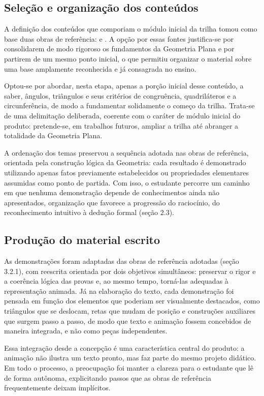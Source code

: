 \subsection{Seleção e organização dos conteúdos}

A definição dos conteúdos que comporiam o módulo inicial da trilha tomou como base duas obras de referência:  e . A opção por essas fontes justifica-se por consolidarem de modo rigoroso os fundamentos da Geometria Plana e por partirem de um mesmo ponto inicial, o que permitiu organizar o material sobre uma base amplamente reconhecida e já consagrada no ensino.

Optou-se por abordar, nesta etapa, apenas a porção inicial desse conteúdo, a saber, ângulos, triângulos e seus critérios de congruência, quadriláteros e a circunferência, de modo a fundamentar solidamente o começo da trilha. Trata-se de uma delimitação deliberada, coerente com o caráter de módulo inicial do produto: pretende-se, em trabalhos futuros, ampliar a trilha até abranger a totalidade da Geometria Plana.

A ordenação dos temas preservou a sequência adotada nas obras de referência, orientada pela construção lógica da Geometria: cada resultado é demonstrado utilizando apenas fatos previamente estabelecidos ou propriedades elementares assumidas como ponto de partida. Com isso, o estudante percorre um caminho em que nenhuma demonstração depende de conhecimentos ainda não apresentados, organização que favorece a progressão do raciocínio, do reconhecimento intuitivo à dedução formal (seção 2.3).

\subsection{Produção do material escrito}

As demonstrações foram adaptadas das obras de referência adotadas (seção 3.2.1), com reescrita orientada por dois objetivos simultâneos: preservar o rigor e a coerência lógica das provas e, ao mesmo tempo, torná-las adequadas à representação animada. Já na elaboração do texto, cada demonstração foi pensada em função dos elementos que poderiam ser visualmente destacados, como triângulos que se deslocam, retas que mudam de posição e construções auxiliares que surgem passo a passo, de modo que texto e animação fossem concebidos de maneira integrada, e não como peças independentes.

Essa integração desde a concepção é uma característica central do produto: a animação não ilustra um texto pronto, mas faz parte do mesmo projeto didático. Em todo o processo, a preocupação foi manter a clareza para o estudante que lê de forma autônoma, explicitando passos que as obras de referência frequentemente deixam implícitos.

